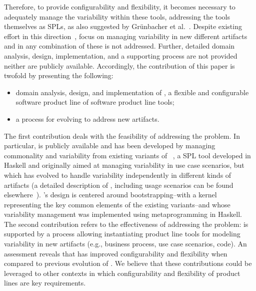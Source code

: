 Therefore, to provide configurability and flexibility, it becomes necessary to adequately manage the variability within these tools, addressing the tools themselves as SPLs, as also suggested by Gr{\"u}nbacher et al.~\cite{grunbacher:2008}. Despite existing effort in this
direction~\cite{grunbacher:2011,grunbacher:2008,batory-ahead-bootstrap}, focus on managing variability in new different artifacts and in any combination of these is not addressed. Further, detailed domain analysis, design, implementation, and a supporting process are not provided neither are publicly available.
Accordingly, the contribution of this paper is twofold by presenting the following:

\begin{itemize}
  \item domain analysis, design, and implementation of \hpl, a flexible and configurable software product line of software product line tools;
  \item a process for evolving \hpl{} to address new artifacts.
\end{itemize}

The first contribution deals with the feasibility of addressing the problem. In particular, \hpl{} is publicly available  and has been developed by managing commonality and variability from existing variants of \hp~\cite{rbonifacio:sbcars2009}, a SPL tool developed in Haskell and originally aimed at managing variability in use case scenarios, but which has evolved to handle variability independently in different kinds of artifacts (a detailed description of \hp, including usage scenarios can be found elsewhere~\cite{rbonifacio:sbcars2009}). \hpl's design is centered around bootstrapping--with a kernel representing the key common elements of the existing \hp{} variants--and whose variability management was implemented using metaprogramming in Haskell. The second contribution refers to the effectiveness of addressing the problem: \hpl{} is supported by a process allowing instantiating product line tools for modeling variability in new artifacts (e.g., business process, use case scenarios, code). An assessment reveals that \hpl{} has improved configurability and flexibility when compared to previous evolution of \hp. We believe that these contributions could be leveraged to other contexts in which configurability and flexibility of product lines are key requirements.

